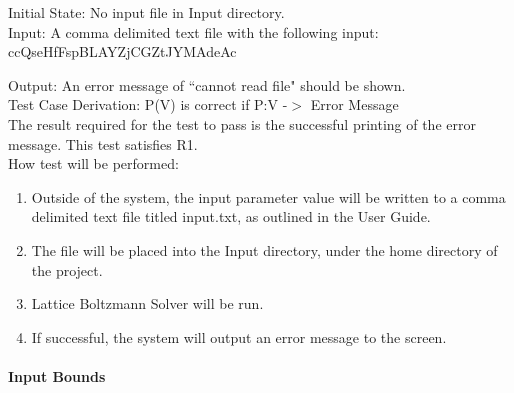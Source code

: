 \documentclass[12pt, titlepage]{article}
\newcommand{\famname}{Lattice Boltzmann Solver}
\begin{document}
\begin{enumerate}
Initial State: No input file in Input directory.\\

Input: A comma delimited text file with the following input:\\
ccQseHfFspBLAYZjCGZtJYMAdeAc

Output: An error message of ``cannot read file" should be shown.\\

Test Case Derivation: P(V) is correct if P:V -$>$ Error Message \\

The result required for the test to pass is the successful printing of the error message. This test satisfies R1.\\

How test will be performed: 

\begin{enumerate}
	\item Outside of the system, the input parameter value will be written to a comma delimited text file titled input.txt, as outlined in the User Guide.
	\item The file will be placed into the Input directory, under the home directory of the project.
	\item {\famname} will be run.
	\item If successful, the system will output an error message to the screen.
\end{enumerate}

\end{enumerate}
			
\paragraph{Input Bounds}
\end{document}
